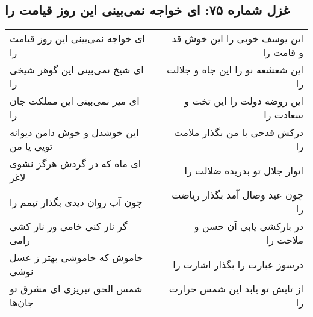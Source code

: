 \begin{center}
\section*{غزل شماره ۷۵: ای خواجه نمی‌بینی این روز قیامت را}
\label{sec:0075}
\begin{longtable}{l p{0.5cm} r}
ای خواجه نمی‌بینی این روز قیامت را
&&
این یوسف خوبی را این خوش قد و قامت را
\\
ای شیخ نمی‌بینی این گوهر شیخی را
&&
این شعشعه نو را این جاه و جلالت را
\\
ای میر نمی‌بینی این مملکت جان را
&&
این روضه دولت را این تخت و سعادت را
\\
این خوشدل و خوش دامن دیوانه تویی یا من
&&
درکش قدحی با من بگذار ملامت را
\\
ای ماه که در گردش هرگز نشوی لاغر
&&
انوار جلال تو بدریده ضلالت را
\\
چون آب روان دیدی بگذار تیمم را
&&
چون عید وصال آمد بگذار ریاضت را
\\
گر ناز کنی خامی ور ناز کشی رامی
&&
در بارکشی یابی آن حسن و ملاحت را
\\
خاموش که خاموشی بهتر ز عسل نوشی
&&
درسوز عبارت را بگذار اشارت را
\\
شمس الحق تبریزی ای مشرق تو جان‌ها
&&
از تابش تو یابد این شمس حرارت را
\\
\end{longtable}
\end{center}
